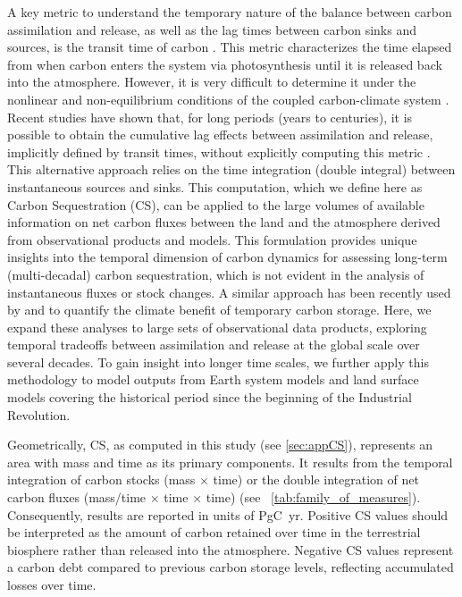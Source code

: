 \documentclass[ProofPDF]{./Styles/Jnls-Template-V3}
\begin{document}
A key metric to understand the temporary nature of the balance between carbon assimilation and release, as well as the lag times between carbon sinks and sources, is the transit time of carbon \citep{Thompson1999}. This metric characterizes the time elapsed from when carbon enters the system via photosynthesis until it is released back into the atmosphere. However, it is very difficult to determine it under the nonlinear and non-equilibrium conditions of the coupled carbon-climate system \citep{Rasmussen2016,Metzler2018PNAS}. Recent studies have shown that, for long periods (years to centuries), it is possible to obtain the cumulative lag effects between assimilation and release, implicitly defined by transit times, without explicitly computing this metric \citep{Metzler2024,Sierra2025}. This alternative approach relies on the time integration (double integral) between instantaneous sources and sinks. This computation, which we define here as Carbon Sequestration (CS), can be applied to the large volumes of available information on net carbon fluxes between the land and the atmosphere derived from observational products and models. This formulation provides unique insights into the temporal dimension of carbon dynamics for assessing long-term (multi-decadal) carbon sequestration, which is not evident in the analysis of instantaneous fluxes or stock changes. A similar approach has been recently used by \citet{Matthews2023} and \citet{Metzler2024} to quantify the climate benefit of temporary carbon storage. Here, we expand these analyses to large sets of observational data products, exploring temporal tradeoffs between assimilation and release at the global scale over several decades. To gain insight into longer time scales, we further apply this methodology to model outputs from Earth system models and land surface models covering the historical period since the beginning of the Industrial Revolution.

Geometrically, CS, as computed in this study (see \ref{sec:appCS}), represents an area with mass and time as its primary components. It results from the temporal integration of carbon stocks (mass $\times$ time) or the double integration of net carbon fluxes (mass/time $\times$ time $\times$ time) (see ~\ref{tab:family_of_measures}). Consequently, results are reported in units of PgC~yr. Positive CS values should be interpreted as the amount of carbon retained over time in the terrestrial biosphere rather than released into the atmosphere. Negative CS values represent a carbon debt compared to previous carbon storage levels, reflecting accumulated losses over time.
\end{document}
